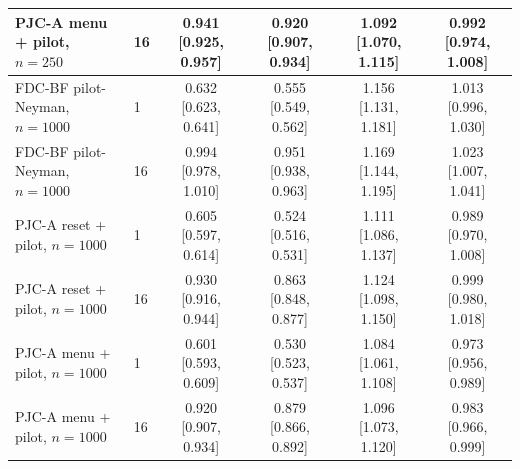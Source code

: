 \begin{table}[t]
\begin{tabular}{llcccc}
PJC-A menu + pilot, $n{=}250$ & 16 & 0.941 {\scriptsize[0.925, 0.957]} & 0.920 {\scriptsize[0.907, 0.934]} & 1.092 {\scriptsize[1.070, 1.115]} & 0.992 {\scriptsize[0.974, 1.008]} \\
\midrule
FDC-BF pilot-Neyman, $n{=}1000$ & 1 & 0.632 {\scriptsize[0.623, 0.641]} & 0.555 {\scriptsize[0.549, 0.562]} & 1.156 {\scriptsize[1.131, 1.181]} & 1.013 {\scriptsize[0.996, 1.030]} \\
FDC-BF pilot-Neyman, $n{=}1000$ & 16 & 0.994 {\scriptsize[0.978, 1.010]} & 0.951 {\scriptsize[0.938, 0.963]} & 1.169 {\scriptsize[1.144, 1.195]} & 1.023 {\scriptsize[1.007, 1.041]} \\
PJC-A reset + pilot, $n{=}1000$ & 1 & 0.605 {\scriptsize[0.597, 0.614]} & 0.524 {\scriptsize[0.516, 0.531]} & 1.111 {\scriptsize[1.086, 1.137]} & 0.989 {\scriptsize[0.970, 1.008]} \\
PJC-A reset + pilot, $n{=}1000$ & 16 & 0.930 {\scriptsize[0.916, 0.944]} & 0.863 {\scriptsize[0.848, 0.877]} & 1.124 {\scriptsize[1.098, 1.150]} & 0.999 {\scriptsize[0.980, 1.018]} \\
PJC-A menu + pilot, $n{=}1000$ & 1 & 0.601 {\scriptsize[0.593, 0.609]} & 0.530 {\scriptsize[0.523, 0.537]} & 1.084 {\scriptsize[1.061, 1.108]} & 0.973 {\scriptsize[0.956, 0.989]} \\
PJC-A menu + pilot, $n{=}1000$ & 16 & 0.920 {\scriptsize[0.907, 0.934]} & 0.879 {\scriptsize[0.866, 0.892]} & 1.096 {\scriptsize[1.073, 1.120]} & 0.983 {\scriptsize[0.966, 0.999]} \\
\bottomrule
\end{tabular}
\end{table}
